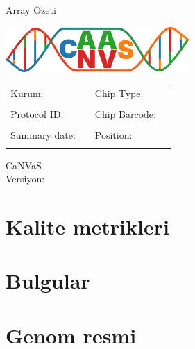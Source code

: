 \documentclass{article}
\newcommand{\institute}{
}
\newcommand{\sampleId}{
}
\newcommand{\summaryDate}{
}
\newcommand{\chipId}{
}
\newcommand{\chipPosition}{
}
\newcommand{\chipType}{
}
\newcommand{\canvasVersion}{
}
\begin{document}
\shorthandoff{=}

\begin{titlepage}
\begin{center}
\Huge \textsf{Array Özeti}
\end{center}
\vspace*{2cm}
\begin{center}
\includegraphics[width=7cm]{canvas_logo.png}

\vspace*{4cm}

\begin{tabular}{l l l l}
\textsf{Kurum: \institute } & \hspace{1cm} & \textsf{Chip Type: \chipType} \\ \\
\textsf{Protocol ID: \sampleId} & \hspace{1cm} & \textsf{Chip Barcode: \chipId} \\ \\
\textsf{Summary date: \summaryDate} & \hspace{1cm} & \textsf{Position: \chipPosition} \\ \\
\end{tabular}

\vspace*{3cm}

\textsf{\LARGE CaNVaS} \\[0.5cm]
\textsf{Versiyon: \canvasVersion}
\end{center}
\end{titlepage}


\section{Kalite metrikleri}


\section{Bulgular}


\section{Genom resmi}
\end{document}
